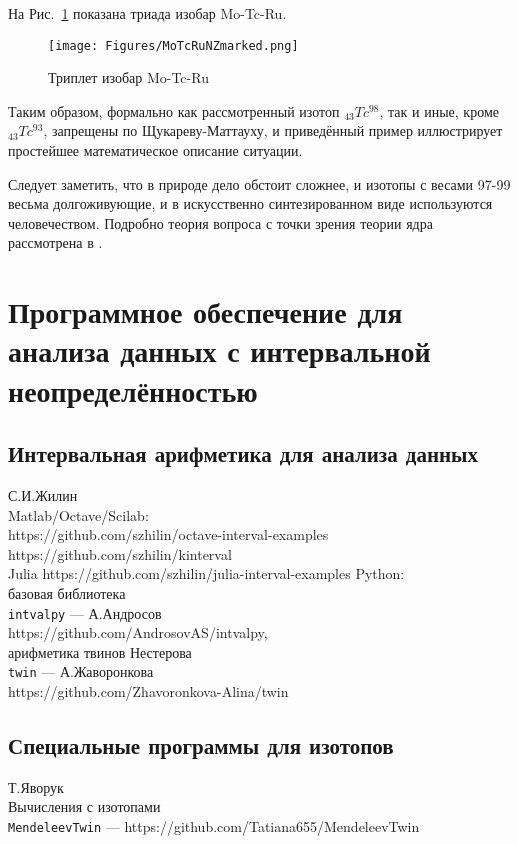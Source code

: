 \documentclass[a5paper,openany]{book}
\begin{document}
На Рис.~\ref{f:IsobarTriplet} показана триада изобар Mo-Tc-Ru.
\begin{figure}[ht] 
	\begin{center}
		\unitlength=1mm
		{\texttt{[image: Figures/MoTcRuNZmarked.png]}}
	\end{center}	
			\caption{Триплет изобар Mo-Tc-Ru} 
\label{f:IsobarTriplet}
\end{figure}	

Таким образом, формально как рассмотренный  изотоп $_{43}Tc^{98}$, так и иные, кроме $_{43}Tc^{93}$, запрещены по Щукареву-Маттауху, и приведённый пример иллюстрирует простейшее  математическое описание ситуации. 

Следует заметить, что в природе дело обстоит сложнее, и изотопы с весами 97-99 весьма долгоживующие, и в искусственно синтезированном виде используются человечеством.
Подробно теория вопроса с точки зрения теории ядра рассмотрена в \cite{Technetium2017}.

\newpage
\section{Программное обеспечение для анализа данных с интервальной неопределённостью}

\subsection{Интервальная арифметика для анализа данных}


С.И.Жилин \\
Matlab/Octave/Scilab:\\
https://github.com/szhilin/octave-interval-examples \cite{InteSoft}\\
https://github.com/szhilin/kinterval \cite{InteKaucherSoft} \\
Julia
https://github.com/szhilin/julia-interval-examples
Python: \\
базовая библиотека\\
{\tt intvalpy} --- А.Андросов \\
 https://github.com/AndrosovAS/intvalpy, \cite{intvalpy} \\
арифметика твинов Нестерова\\
{\tt twin} --- А.Жаворонкова \\
https://github.com/Zhavoronkova-Alina/twin \cite{PythonTwin}

\subsection{Специальные программы для изотопов}
Т.Яворук \\
Вычисления с изотопами\\
{\tt MendeleevTwin} ---  https://github.com/Tatiana655/MendeleevTwin \cite{MendeleevTwin}
\end{document}
